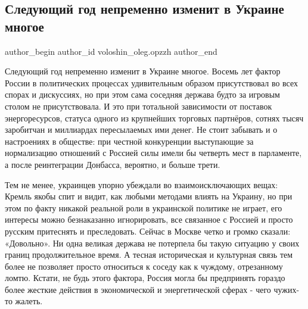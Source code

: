  
 
 
 
 
 
\subsection{Следующий год непременно изменит в Украине многое}
\label{sec:31_12_2021.fb.voloshin_oleg.opzzh.1.sledujuschij_god_ukraina}
 
\ifcmt
 author_begin
   author_id voloshin_oleg.opzzh
 author_end
\fi

Следующий год непременно изменит в Украине многое. Восемь лет фактор России в
политических процессах удивительным образом присутствовал во всех спорах и
дискуссиях, но при этом сама соседняя держава будто за игровым столом не
присутствовала. И это при тотальной зависимости от поставок энергоресурсов,
статуса одного из крупнейших торговых партнёров, сотнях тысяч заробитчан и
миллиардах пересылаемых ими денег. Не стоит забывать и о настроениях в
обществе: при честной конкуренции выступающие за нормализацию отношений с
Россией силы имели бы четверть мест в парламенте, а после реинтеграции
Донбасса, вероятно, и больше трети. 

Тем не менее, украинцев упорно убеждали во взаимоисключающих вещах: Кремль
якобы спит и видит, как любыми методами влиять на Украину, но при этом по факту
никакой реальной роли в украинской политике не играет, его интересы можно
безнаказанно игнорировать, все связанное с Россией и просто русским притеснять
и преследовать. Сейчас в Москве четко и громко сказали: «Довольно». Ни одна
великая держава не потерпела бы такую ситуацию у своих границ продолжительное
время. А тесная историческая и культурная связь тем более не позволяет просто
относиться к соседу как к чуждому, отрезанному ломтю. Кстати, не будь этого
фактора, Россия могла бы предпринять гораздо более жесткие действия в
экономической и энергетической сферах - чего чужих-то жалеть. 

